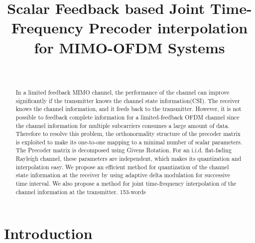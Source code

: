 \documentclass[conference]{IEEEtran}
\begin{document}

\title{Scalar Feedback based Joint Time-Frequency Precoder
  interpolation for  MIMO-OFDM Systems}



 \author{
 \
}
\maketitle

\thispagestyle{plain}



\begin{abstract}
In a limited feedback MIMO channel, the performance of the channel can improve significantly if the transmitter knows the channel state information(CSI). The receiver knows the channel information, and it feeds back to the transmitter. However, it is not possible to feedback complete information for a limited-feedback OFDM channel since the channel information for multiple subcarriers consumes a large amount of data. Therefore to resolve this problem, the orthonormality structure of the precoder matrix is exploited to make its one-to-one mapping to a minimal number of scalar parameters. The Precoder matrix is decomposed using Givens Rotation. For an i.i.d. flat-fading Rayleigh channel, these parameters are independent, which makes its quantization and interpolation easy. We propose an efficient method for quantization of the channel state information at the receiver by using adaptive delta modulation for successive time interval. We also propose a method for joint time-frequency interpolation of the channel information at the transmitter. 153-words
\end{abstract}

\section{Introduction}
\label{intro}
\end{document}
